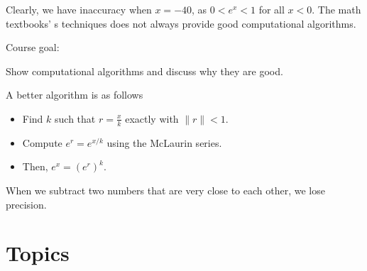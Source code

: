 Clearly, we have inaccuracy when \( x = -40 \), as \( 0 < e^x < 1 \) for all \( x < 0 \). The math textbooks'
s techniques does not always provide good computational algorithms.

Course goal:

Show computational algorithms and discuss why they are good.

\begin{example}
    A better algorithm is as follows

    \begin{itemize}
        \item Find \( k \) such that \( r = \frac{x}{k} \) exactly with \( \|r \| < 1 \).
        \item Compute $e^{r} = e^{x/k}$ using the McLaurin series.
        \item Then, $e^x = (e^r)^k$.
    \end{itemize}
\end{example}

\begin{remark}
    When we subtract two numbers that are very close to each other, we lose precision.
\end{remark}

\section{Topics}

